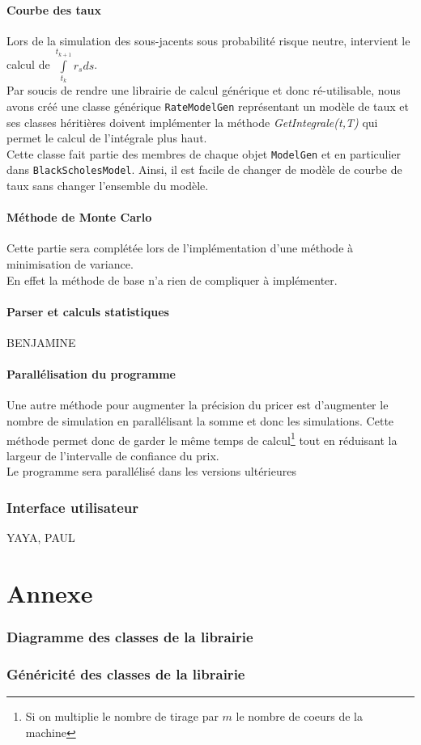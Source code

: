 \documentclass[a4paper,12pt]{article}
\begin{document}
\subsection{Courbe des taux}
Lors de la simulation des sous-jacents sous probabilité risque neutre, intervient le calcul de $\int\limits_{t_k}^{t_{k+1}}r_sds$. \\
Par soucis de rendre une librairie de calcul générique et donc ré-utilisable, nous avons créé une classe générique {\tt RateModelGen} représentant un modèle de taux et ses classes héritières doivent implémenter la méthode {\it GetIntegrale(t,T)} qui permet le calcul de l'intégrale plus haut. \\[1mm]Cette classe fait partie des membres de chaque objet {\tt ModelGen} et en particulier dans {\tt BlackScholesModel}. Ainsi, il est facile de changer de modèle de courbe de taux sans changer l'ensemble du modèle.
\newpage
\subsection{Méthode de Monte Carlo}
Cette partie sera complétée lors de l'implémentation d'une méthode à minimisation de variance. \\
En effet la méthode de base n'a rien de compliquer à implémenter.
\subsection{Parser et calculs statistiques}
BENJAMINE
\subsection{Parallélisation du programme}
Une autre méthode pour augmenter la précision du pricer est d'augmenter le nombre de simulation en parallélisant la somme et donc les simulations. Cette méthode permet donc de garder le même temps de calcul\footnote{Si on multiplie le nombre de tirage par $m$ le nombre de coeurs de la machine} tout en réduisant la largeur de l'intervalle de confiance du prix. \\
Le programme sera parallélisé dans les versions ultérieures
\newpage
\section{Interface utilisateur}
YAYA, PAUL
\part{Annexe}
\section{Diagramme des classes de la librairie}
\label{diagrammeClasse}
\section{Généricité des classes de la librairie}
 
\end{document}
